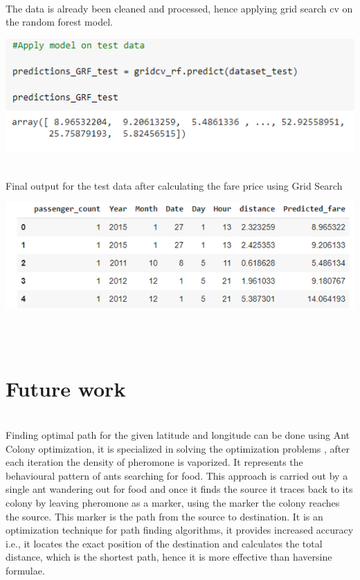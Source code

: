 \documentclass[journal,twoside,web]{ieeecolor}
\begin{document}
\\
The data is already been cleaned and processed, hence applying grid search cv on the random forest model.
\\
\begin{center}
\includegraphics[scale=0.60]{Picture40.png}
\end{center}
\\
Final output for the test data after calculating the fare price using Grid Search
\\
\begin{center}
\includegraphics[scale=0.60]{Picture41.png}
\end{center}
\\
\\
\section{Future work}
\label{Future work}
\\
Finding optimal path for the given latitude and longitude can be done using Ant Colony optimization, it is specialized in solving the optimization problems , after each iteration the density of pheromone is vaporized. It represents the behavioural pattern of ants searching for food. This approach is carried out by a single ant wandering out for food and once it finds the source it traces back to its colony by leaving pheromone as a marker, using the marker the colony reaches the source. This marker is the path from the source to destination. It is an optimization technique for path finding algorithms, it provides increased accuracy i.e., it locates the exact position of the destination and calculates the total distance, which is the shortest path, hence it is more effective than haversine formulae.
\end{document}
